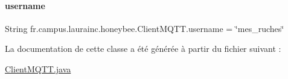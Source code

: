 \paragraph{\texorpdfstring{username}{username}}
{\footnotesize\ttfamily String fr.\+campus.\+laurainc.\+honeybee.\+Client\+M\+Q\+T\+T.\+username = \char`\"{}mes\+\_\+ruches\char`\"{}\hspace{0.3cm}{\ttfamily [private]}}



La documentation de cette classe a été générée à partir du fichier suivant \+:\begin{DoxyCompactItemize}
\item 
\hyperlink{_client_m_q_t_t_8java}{Client\+M\+Q\+T\+T.\+java}\end{DoxyCompactItemize}

